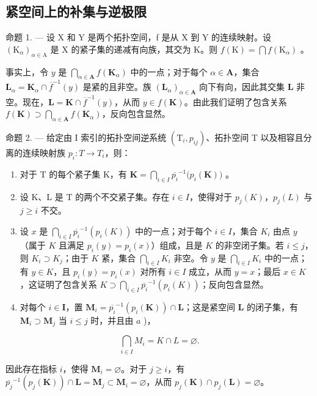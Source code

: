 \subsection{紧空间上的补集与逆极限}

命题 1. --- 设 X 和 Y 是两个拓扑空间，f 是从 X 到 Y 的连续映射。设 \((\mathrm{K}_{\alpha})_{\alpha \in \mathrm{A}}\) 是 X 的紧子集的递减有向族，其交为 K。则 \(f(\mathrm{K}) = \bigcap f(\mathrm{K}_{\alpha})\) 。

事实上，令 \(y\) 是 \(\bigcap_{\alpha \in \mathbf{A}} f(\mathbf{K}_{\alpha})\) 中的一点；对于每个 \(\alpha \in \mathbf{A}\)，集合 \(\mathbf{L}_{\alpha} = \mathbf{K}_{\alpha} \cap \overline{f}^{-1}(y)\) 是紧的且非空。族 \((\mathbf{L}_{\alpha})_{\alpha \in \mathbf{A}}\) 向下有向，因此其交集 \(\mathbf{L}\) 非空。现在，\(\mathbf{L} = \mathbf{K} \cap \overline{f}^{-1}(y)\)，从而 \(y \in f(\mathbf{K})\)。由此我们证明了包含关系 \(f(\mathbf{K}) \supset \bigcap_{\alpha \in \mathbf{A}} f(\mathbf{K}_{\alpha})\)，反向包含显然。

命题 2. --- 给定由 I 索引的拓扑空间逆系统 \((\mathrm{T}_{i}, p_{ij})\)、拓扑空间 T 以及相容且分离的连续映射族 \(p_{i}: T \to T_{i}\)，则：

\begin{enumerate}
\def\labelenumi{\alph{enumi})}
\item
  对于 T 的每个紧子集 K，有 \(\mathbf{K} = \bigcap_{i\in I}\overline{p_i}^{-1}\big(p_i(\mathbf{K})\big)\) 。
\item
  设 K、L 是 T 的两个不交紧子集。存在 \(i \in I\)，使得对于 \(p_{j}(K)\)，\(p_{j}(L)\) 与 \(j \geqslant i\) 不交。
\item
设 \(x\) 是 \(\bigcap_{i \in I} \overline{p_i}^{-1}(p_i(K))\) 中的一点；对于每个 \(i \in I\)，集合 \(K_i\) 由点 \(y\)（属于 \(K\) 且满足 \(p_i(y) = p_i(x)\)）组成，且是 \(K\) 的非空闭子集。若 \(i \leqslant j\)，则 \(K_i \supset K_j\)；由于 \(K\) 紧，集合 \(\bigcap_{i \in I} K_i\) 非空。令 \(y\) 是 \(\bigcap_{i \in I} K_i\) 中的一点；有 \(y \in K\)，且 \(p_i(y) = p_i(x)\) 对所有 \(i \in I\) 成立，从而 \(y = x\)；最后 \(x \in K\)，这证明了包含关系 \(K \supset \bigcap_{i \in I} \overline{p_i}^{-1}(p_i(K))\)；反向包含显然。
\item
  对每个 \(i \in \mathbf{I}\)，置 \(\mathbf{M}_i = \overline{p_i}^{-1}(p_i(\mathbf{K})) \cap \mathbf{L}\)；这是紧空间 \(\mathbf{L}\) 的闭子集，有 \(\mathbf{M}_i \supset \mathbf{M}_j\) 当 \(i \leqslant j\) 时，并且由 \(a\) )，
\end{enumerate}

\[
\bigcap_ {i \in I} M _ {i} = K \cap L = \varnothing .
\]

因此存在指标 \(i\)，使得 \(\mathbf{M}_i = \varnothing\)。对于 \(j \geqslant i\)，有 \(\overline{p_j}^{-1} (p_j(\mathbf{K})) \cap \mathbf{L} = \mathbf{M}_j \subset \mathbf{M}_i = \varnothing\)，从而 \(p_j(\mathbf{K}) \cap p_j(\mathbf{L}) = \varnothing\)。
\relax{}
